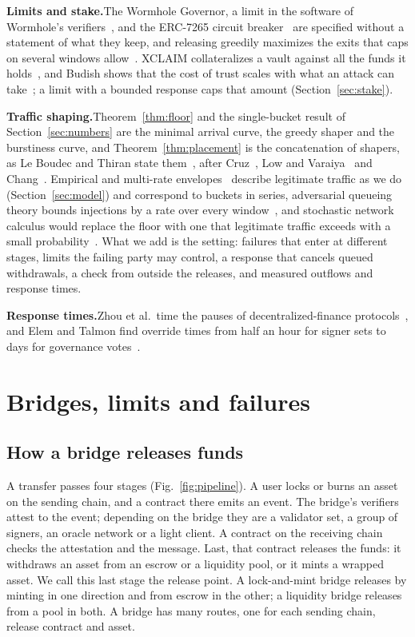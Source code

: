 \documentclass[conference,compsoc]{IEEEtran}
\numberwithin{equation}{section}
\theoremstyle{plain}
\theoremstyle{definition}
\theoremstyle{remark}
\newcommand{\runin}[1]{\par\smallskip\noindent\textbf{#1.}\enspace}
\begin{document}
\runin{Limits and stake}The Wormhole Governor, a limit in the software of Wormhole's verifiers~\cite{wormhole_governor}, and the ERC-7265 circuit breaker~\cite{erc7265} are specified without a statement of what they keep, and releasing greedily maximizes the exits that caps on several windows allow~\cite{neuder2024exit}. XCLAIM collateralizes a vault against all the funds it holds~\cite{zamyatin2019xclaim}, and Budish shows that the cost of trust scales with what an attack can take~\cite{budish2025trust}; a limit with a bounded response caps that amount (Section~\ref{sec:stake}).

\runin{Traffic shaping}Theorem~\ref{thm:floor} and the single-bucket result of Section~\ref{sec:numbers} are the minimal arrival curve, the greedy shaper and the burstiness curve, and Theorem~\ref{thm:placement} is the concatenation of shapers, as Le Boudec and Thiran state them~\cite{leboudec2001}, after Cruz~\cite{cruz1991}, Low and Varaiya~\cite{low1993burstiness} and Chang~\cite{chang2000performance}. Empirical and multi-rate envelopes~\cite{wrege1996deterministic,knightly1997dbind} describe legitimate traffic as we do (Section~\ref{sec:model}) and correspond to buckets in series, adversarial queueing theory bounds injections by a rate over every window~\cite{borodin2001adversarial}, and stochastic network calculus would replace the floor with one that legitimate traffic exceeds with a small probability~\cite{fidler2015guide}. What we add is the setting: failures that enter at different stages, limits the failing party may control, a response that cancels queued withdrawals, a check from outside the releases, and measured outflows and response times.

\runin{Response times}Zhou et al.\ time the pauses of decentralized-finance protocols~\cite{zhou2023sok}, and Elem and Talmon find override times from half an hour for signer sets to days for governance votes~\cite{elem2026overrides}.

\section{Bridges, limits and failures}\label{sec:bridges}

\subsection{How a bridge releases funds}\label{sec:pipeline}

A transfer passes four stages (Fig.~\ref{fig:pipeline}). A user locks or burns an asset on the sending chain, and a contract there emits an event. The bridge's verifiers attest to the event; depending on the bridge they are a validator set, a group of signers, an oracle network or a light client. A contract on the receiving chain checks the attestation and the message. Last, that contract releases the funds: it withdraws an asset from an escrow or a liquidity pool, or it mints a wrapped asset. We call this last stage the release point. A lock-and-mint bridge releases by minting in one direction and from escrow in the other; a liquidity bridge releases from a pool in both. A bridge has many routes, one for each sending chain, release contract and asset.
\end{document}
